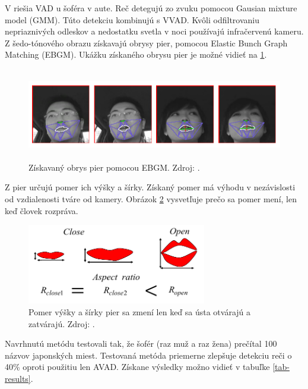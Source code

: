 V \cite{aoki2007voice} riešia VAD u šoféra v aute.
Reč detegujú zo zvuku pomocou Gausian mixture model (GMM).
Túto detekciu kombinujú s VVAD.
Kvôli odfiltrovaniu nepriaznivých odleskov a nedostatku svetla v noci používajú infračervenú kameru.
Z šedo-tónového obrazu získavajú obrysy pier, pomocou Elastic Bunch Graph Matching (EBGM).
Ukážku získaného obrysu pier je možné vidieť na \ref{pic-EBGM}. 

\begin{figure}[H]
	\begin{center}
		\includegraphics[height=4cm]{pics/EBGM.png}
		\caption{Získavaný obrys pier pomocou EBGM.
		Zdroj: \cite{aoki2007voice}.}
		\label{pic-EBGM}
	\end{center}
\end{figure}

Z pier určujú pomer ich výšky a šírky.
Získaný pomer má výhodu v nezávislosti od vzdialenosti tváre od kamery.
Obrázok \ref{pic-pery} vysvetľuje prečo sa pomer mení, len keď človek rozpráva.

\begin{figure}[H]
	\begin{center}
		\includegraphics[height=3.5cm]{pics/pery.png}
		\caption{Pomer výšky a šírky pier sa zmení len keď sa ústa otvárajú a zatvárajú.
		Zdroj: \cite{aoki2007voice}.}
		\label{pic-pery}
	\end{center}
\end{figure}

Navrhnutú metódu testovali tak, že šofér (raz muž a raz žena) prečítal 100 názvov japonských miest.
Testovaná metóda priemerne zlepšuje detekciu reči o 40\% oproti použitiu len AVAD.  
Získane výsledky možno vidieť v tabuľke \ref{tab-results}.

